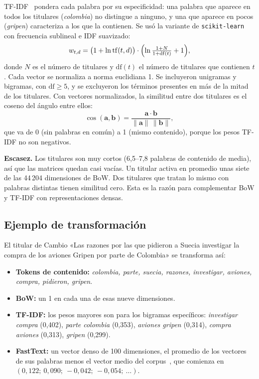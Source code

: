 \documentclass[10pt,twocolumn]{article}
\begin{document}
TF-IDF~\cite{sparckjones1972,salton1988} pondera cada palabra por su
especificidad: una palabra que aparece en todos los titulares
(\textit{colombia}) no distingue a ninguno, y una que aparece en pocos
(\textit{gripen}) caracteriza a los que la contienen. Se usó la variante de
\texttt{scikit-learn} con frecuencia sublineal e IDF suavizado:
\begin{equation}
w_{t,d}=\bigl(1+\ln \mathrm{tf}(t,d)\bigr)\cdot
\Bigl(\ln\tfrac{1+N}{1+\mathrm{df}(t)}+1\Bigr),
\end{equation}
donde $N$ es el número de titulares y $\mathrm{df}(t)$ el número de titulares
que contienen $t$. Cada vector se normaliza a norma euclidiana 1. Se incluyeron
unigramas y bigramas, con $\mathrm{df}\geq5$, y se excluyeron los términos
presentes en más de la mitad de los titulares. Con vectores normalizados, la
similitud entre dos titulares es el coseno del ángulo entre ellos:
\begin{equation}
\cos(\mathbf{a},\mathbf{b})=\frac{\mathbf{a}\cdot\mathbf{b}}
{\lVert\mathbf{a}\rVert\,\lVert\mathbf{b}\rVert},
\end{equation}
que va de 0 (sin palabras en común) a 1 (mismo contenido), porque los pesos
TF-IDF no son negativos.

\textbf{Escasez.} Los titulares son muy cortos (6,5--7,8 palabras de contenido
de media), así que las matrices quedan casi vacías. Un titular activa en
promedio unas siete de las 44\,204 dimensiones de BoW. Dos titulares que tratan
lo mismo con palabras distintas tienen similitud cero. Esta es la razón para
complementar BoW y TF-IDF con representaciones densas.

\subsection{Ejemplo de transformación}

El titular de Cambio «Las razones por las que pidieron a Suecia investigar la
compra de los aviones Gripen por parte de Colombia» se transforma así:

\begin{itemize}
\item \textbf{Tokens de contenido:} \textit{colombia, parte, suecia, razones,
investigar, aviones, compra, pidieron, gripen}.
\item \textbf{BoW:} un 1 en cada una de esas nueve dimensiones.
\item \textbf{TF-IDF:} los pesos mayores son para los bigramas específicos:
\textit{investigar compra} (0,402), \textit{parte colombia} (0,353),
\textit{aviones gripen} (0,314), \textit{compra aviones} (0,313),
\textit{gripen} (0,299).
\item \textbf{FastText:} un vector denso de 100 dimensiones, el promedio de los
vectores de sus palabras menos el vector medio del corpus~\cite{arora2017}, que
comienza en $(0{,}122;\ 0{,}090;\ -0{,}042;\ -0{,}054;\ \ldots)$.
\end{itemize}
\end{document}
